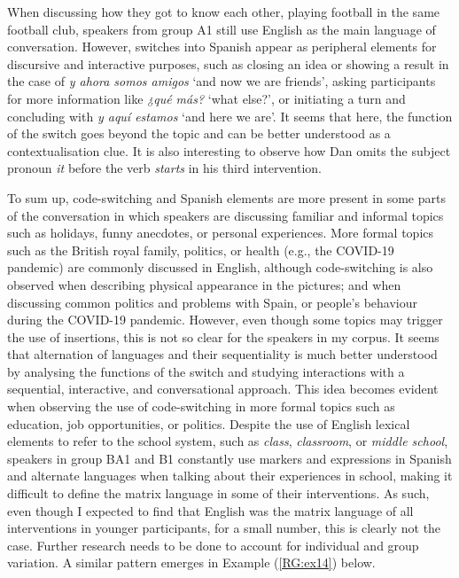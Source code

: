 \documentclass[output=paper]{langscibook}
\begin{document}
When discussing how they got to know each other, playing football in the same football club, speakers from group A1 still use English as the main language of conversation. However, switches into Spanish appear as peripheral elements for discursive and interactive purposes, such as closing an idea or showing a result in the case of \textit{y ahora somos amigos} ‘and now we are friends’, asking participants for more information like \textit{¿qué más?} ‘what else?’, or initiating a turn and concluding with \textit{y aquí estamos} ‘and here we are’. It seems that here, the function of the switch goes beyond the topic and can be better understood as a contextualisation clue. It is also interesting to observe how Dan omits the subject pronoun \textit{it} before the verb \textit{starts} in his third intervention.

To sum up, code-switching and Spanish elements are more present in some parts of the conversation in which speakers are discussing familiar and informal topics such as holidays, funny anecdotes, or personal experiences. More formal topics such as the British royal family, politics, or health (e.g., the COVID-19 pandemic) are commonly discussed in English, although code-switching is also observed when describing physical appearance in the pictures; and when discussing common politics and problems with Spain, or people’s behaviour during the COVID-19 pandemic. However, even though some topics may trigger the use of insertions, this is not so clear for the speakers in my corpus. It seems that alternation of languages and their sequentiality is much better understood by analysing the functions of the switch and studying interactions with a sequential, interactive, and conversational approach. This idea becomes evident when observing the use of code-switching in more formal topics such as education, job opportunities, or politics. Despite the use of English lexical elements to refer to the school system, such as \textit{class}, \textit{classroom}, or \textit{middle school}, speakers in group BA1 and B1 constantly use markers and expressions in Spanish and alternate languages when talking about their experiences in school, making it difficult to define the matrix language in some of their interventions. As such, even though I expected to find that English was the matrix language of all interventions in younger participants, for a small number, this is clearly not the case. Further research needs to be done to account for individual and group variation. A similar pattern emerges in Example (\ref{RG:ex14}) below.
\end{document}

